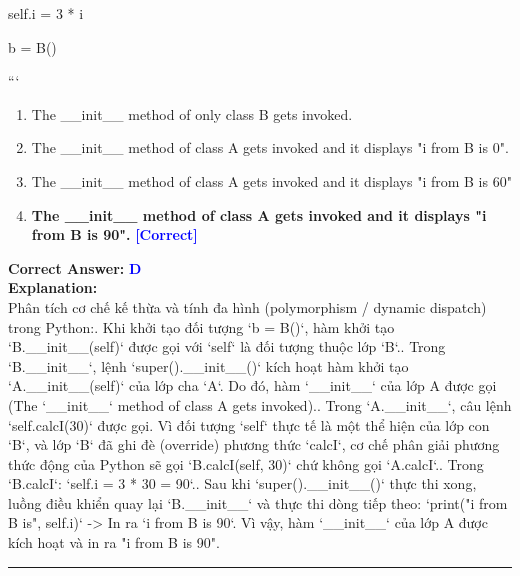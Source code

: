 \documentclass[11pt,a4paper]{article}
\begin{document}
\begin{minipage}{\textwidth}
{\newline
        self.i = 3 * i\newline

\newline
\newline

\newline
b = B()\newline

\newline
```}

\begin{enumerate}[label=\Alph*.]
    \item The __init__ method of only class B gets invoked.
    \item The __init__ method of class A gets invoked and it displays "i from B is 0".
    \item The __init__ method of class A gets invoked and it displays "i from B is 60"
    \item \textbf{The __init__ method of class A gets invoked and it displays "i from B is 90".} \hfill \textcolor{blue}{\textbf{[Correct]}}
\end{enumerate}

\noindent \textbf{Correct Answer:} \textcolor{blue}{\textbf{D}} \\[4pt]
\noindent \textbf{Explanation:}\\
Phân tích cơ chế kế thừa và tính đa hình (polymorphism / dynamic dispatch) trong Python:. Khi khởi tạo đối tượng `b = B()`, hàm khởi tạo `B.__init__(self)` được gọi với `self` là đối tượng thuộc lớp `B`.. Trong `B.__init__`, lệnh `super().__init__()` kích hoạt hàm khởi tạo `A.__init__(self)` của lớp cha `A`. Do đó, hàm `__init__` của lớp A được gọi (The `__init__` method of class A gets invoked).. Trong `A.__init__`, câu lệnh `self.calcI(30)` được gọi. Vì đối tượng `self` thực tế là một thể hiện của lớp con `B`, và lớp `B` đã ghi đè (override) phương thức `calcI`, cơ chế phân giải phương thức động của Python sẽ gọi `B.calcI(self, 30)` chứ không gọi `A.calcI`.. Trong `B.calcI`: `self.i = 3 * 30 = 90`.. Sau khi `super().__init__()` thực thi xong, luồng điều khiển quay lại `B.__init__` và thực thi dòng tiếp theo: `print("i from B is", self.i)` -> In ra `i from B is 90`.\newline
Vì vậy, hàm `__init__` của lớp A được kích hoạt và in ra "i from B is 90".
\end{minipage}
\vspace{0.8cm}
\hrule
\vspace{0.5cm}
\end{document}
